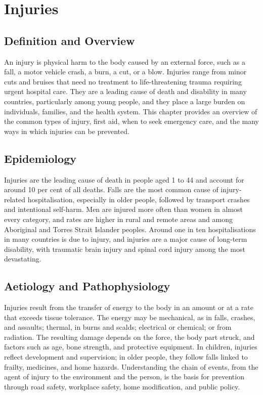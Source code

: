 \chapter{Injuries}

\section*{Definition and Overview}
An injury is physical harm to the body caused by an external force, such as a fall, a motor vehicle crash, a burn, a cut, or a blow. Injuries range from minor cuts and bruises that need no treatment to life-threatening trauma requiring urgent hospital care. They are a leading cause of death and disability in many countries, particularly among young people, and they place a large burden on individuals, families, and the health system. This chapter provides an overview of the common types of injury, first aid, when to seek emergency care, and the many ways in which injuries can be prevented.

\section*{Epidemiology}
Injuries are the leading cause of death in people aged 1 to 44 and account for around 10 per cent of all deaths. Falls are the most common cause of injury-related hospitalisation, especially in older people, followed by transport crashes and intentional self-harm. Men are injured more often than women in almost every category, and rates are higher in rural and remote areas and among Aboriginal and Torres Strait Islander peoples. Around one in ten hospitalisations in many countries is due to injury, and injuries are a major cause of long-term disability, with traumatic brain injury and spinal cord injury among the most devastating.

\section*{Aetiology and Pathophysiology}
Injuries result from the transfer of energy to the body in an amount or at a rate that exceeds tissue tolerance. The energy may be mechanical, as in falls, crashes, and assaults; thermal, in burns and scalds; electrical or chemical; or from radiation. The resulting damage depends on the force, the body part struck, and factors such as age, bone strength, and protective equipment. In children, injuries reflect development and supervision; in older people, they follow falls linked to frailty, medicines, and home hazards. Understanding the chain of events, from the agent of injury to the environment and the person, is the basis for prevention through road safety, workplace safety, home modification, and public policy.

